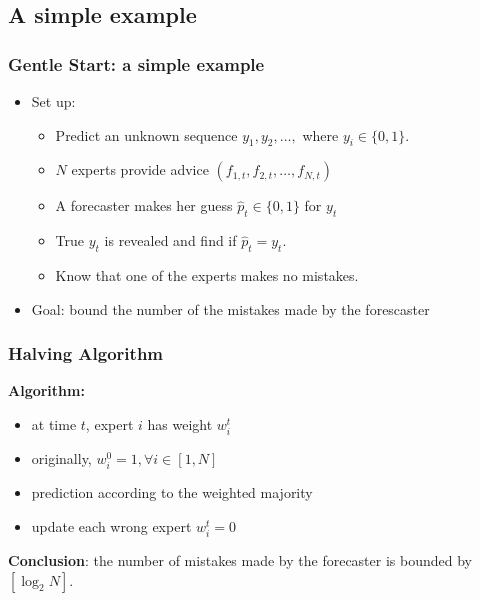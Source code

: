 \documentclass{beamer}
\begin{document}
\subsection{A simple example}
\begin{frame}
\frametitle{Gentle Start: a simple example}
\begin{itemize}
\item Set up:
\begin{itemize}
\item Predict an unknown sequence $y_1, y_2, \ldots,$ where $y_i\in\{0,1\}.$
\pause
\item $N$ experts provide advice $(f_{1,t},f_{2,t},\ldots, f_{N,t})$
\pause
\item A forecaster makes her guess $\hat{p}_t\in\{0,1\}$ for $y_t$ 
\pause
\item True $y_t$ is revealed and find if $\hat{p}_t = y_t$. 
\pause
\item Know that one of the experts makes no mistakes.
\pause
\end{itemize}
\item Goal: bound the number of the mistakes made by the forescaster
\end{itemize}
\end{frame}

\begin{frame}
\frametitle{Halving Algorithm}
{\bf Algorithm:}
\begin{itemize}
\item at time $t$, expert $i$ has weight $w_i^t$
\pause
\item originally, $w_i^0 = 1, \forall i\in[1,N]$
\pause
\item prediction according to the weighted majority 
\pause
\item update each wrong expert   $w_i^t = 0$
\pause
\end{itemize}
{\bf Conclusion}: the number of mistakes made by the forecaster is bounded by {\color{red}$[\log_2 N]$}.
\end{frame}
\end{document}
